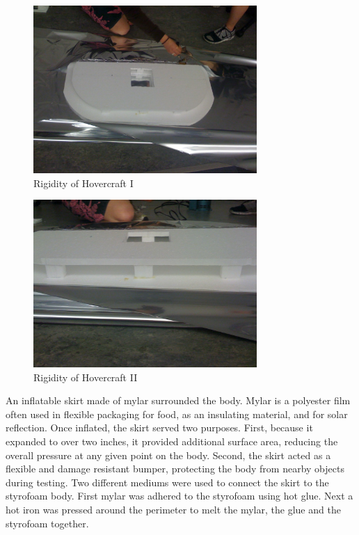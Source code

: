 \begin{figure}[h]
  \begin{center}
    \includegraphics[width=85mm]{imageSources/rigidity1.png}
  \end{center}
  \caption{Rigidity of Hovercraft I} 
  \label{rigidity1}
\end{figure}

\begin{figure}[h]
  \begin{center}
    \includegraphics[width=85mm]{imageSources/rigidity2.png}
  \end{center}
  \caption{Rigidity of Hovercraft II} 
  \label{rigidity2}
\end{figure}

An inflatable skirt made of mylar surrounded the body. Mylar is a polyester film often used in flexible packaging for food, as an insulating material, and for solar reflection. Once inflated, the skirt served two purposes. First, because it expanded to over two inches, it provided additional surface area, reducing the overall pressure at any given point on the body. Second, the skirt acted as a flexible and damage resistant bumper, protecting the body from nearby objects during testing. Two different mediums were used to connect the skirt to the styrofoam body. First mylar was adhered to the styrofoam using hot glue.  Next a hot iron was pressed around the perimeter to melt the mylar, the glue and the styrofoam together.

